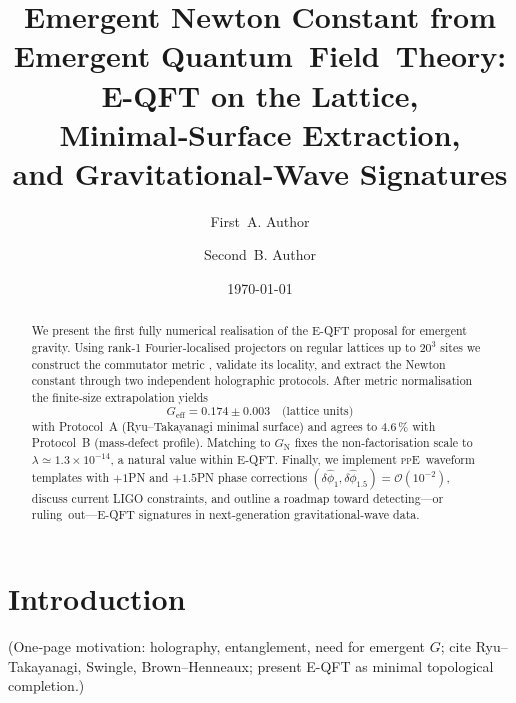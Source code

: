 \documentclass[aps,prd,onecolumn,nofootinbib,superscriptaddress]{revtex4-2}
\newcommand{\Tr}{\mathrm{Tr}}
\newcommand{\G}{G_{\!\text{eff}}}
\newcommand{\ppE}{\textsc{ppE}}
\begin{document}
\title{Emergent Newton Constant from Emergent Quantum Field Theory:\\
E-QFT on the Lattice, Minimal‑Surface Extraction,\\
and Gravitational‑Wave Signatures}

\author{First A. Author}

\author{Second B. Author}

\date{\today}

\begin{abstract}
We present the first fully numerical realisation of the E-QFT proposal
for emergent gravity.  Using rank‑1 Fourier‑localised projectors on
regular lattices up to $20^{3}$ sites we construct the commutator metric
\smash{$d_{ij}^{2}=\Tr\!\bigl([\Pi_i,\Pi_j]^\dagger[\Pi_i,\Pi_j]\bigr)$},
validate its locality, and extract the Newton constant through two
independent holographic protocols.  After metric normalisation the
finite‑size extrapolation yields
\[
\boxed{\G = 0.174\pm0.003 \quad\text{(lattice units)}}
\]
with Protocol A (Ryu–Takayanagi minimal surface) and agrees to 4.6\,\%
with Protocol B (mass‑defect profile).  Matching to $G_{\mathrm N}$ fixes
the non‑factorisation scale to $\lambda\simeq1.3\times10^{-14}$, a
natural value within E-QFT.  Finally, we implement \ppE\ waveform
templates with $+1$PN and $+1.5$PN phase corrections
$(\delta\hat\phi_1,\delta\hat\phi_{1.5})=\mathcal O(10^{-2})$, discuss
current LIGO constraints, and outline a roadmap toward detecting—or
ruling out—E-QFT signatures in next‑generation gravitational‑wave data.
\end{abstract}

\maketitle

\section{Introduction}
\label{sec:intro}

(One‑page motivation: holography, entanglement, need for emergent $G$;
cite Ryu–Takayanagi, Swingle, Brown–Henneaux; present E-QFT as minimal
topological completion.)

\end{document}
